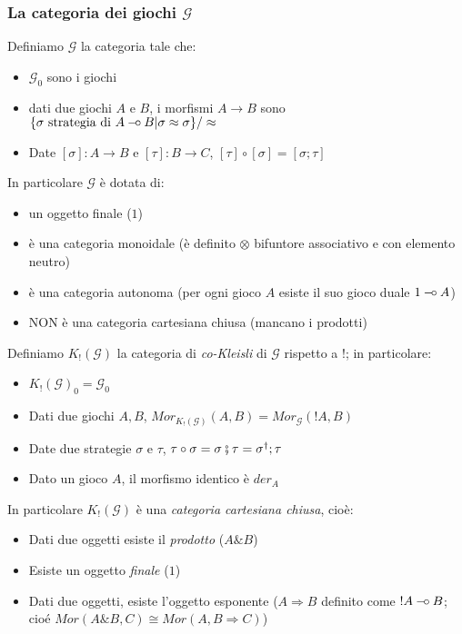 \documentclass{beamer}
\newcommand{\limp}{\mathbin{{-}\mkern-3.5mu{\circ}}}
\begin{document}
\begin{frame}
 	
 	\frametitle{La categoria dei giochi $\mathcal{G}$}
 	
 	Definiamo $\mathcal{G}$ la categoria tale che:
 	\begin{itemize}
 		\item $\mathcal{G}_0$ sono i giochi
 		\item dati due giochi $A$ e $B$, i morfismi $A\rightarrow B$ sono $\{ \sigma \text{ strategia di } A\limp B | \sigma \approx \sigma \} / \approx$
 		\item Date $[\sigma] : A\rightarrow B$ e $[\tau] : B \rightarrow C$, $[\tau] \circ [\sigma] = [\sigma ; \tau]$
 	\end{itemize}
 	
 	In particolare $\mathcal{G}$ è dotata di:
 	\begin{itemize}
 		\item un oggetto finale ($1$)
 		\item è una categoria monoidale (è definito $\otimes$ bifuntore associativo e con elemento neutro)
 		\item è una categoria autonoma (per ogni gioco $A$ esiste il suo gioco duale $1 \limp A$)
 		\item NON è una categoria cartesiana chiusa (mancano i prodotti)
 	\end{itemize}
 	
 \end{frame}

\begin{frame}

Definiamo $K_!(\mathcal{G})$ la categoria di \emph{co-Kleisli} di $\mathcal{G}$ rispetto a $!$; in particolare:
	
	\begin{itemize}
		\item $K_!(\mathcal{G})_0 = \mathcal{G}_0$
		\item Dati due giochi $A,B$, $Mor_{K_!(\mathcal{G})}(A,B) = Mor_{\mathcal{G}}(!A,B)$
		\item Date due strategie $\sigma$ e $\tau$, $\tau \circ \sigma = \sigma \fatsemi \tau = \sigma ^\dag ; \tau$
		\item Dato un gioco $A$, il morfismo identico è $der_A$
	\end{itemize}

	In particolare $K_!(\mathcal{G})$ è una \emph{categoria cartesiana chiusa}, cioè:
	\begin{itemize}
		\item Dati due oggetti esiste il \emph{prodotto} ($A\& B$)
		\item Esiste un oggetto \emph{finale} ($1$)
		\item Dati due oggetti, esiste l'oggetto esponente ($A \Rightarrow B$ definito come $!A \limp B$; cioé $Mor(A\& B,C) \cong Mor(A,B\Rightarrow C)$)
	\end{itemize}

\end{frame}
\end{document}

